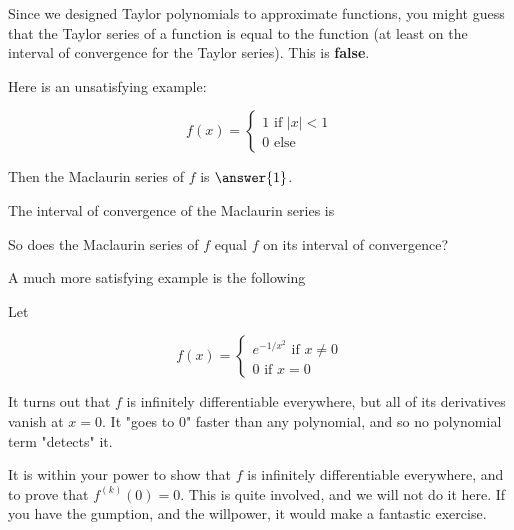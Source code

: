 \documentclass{ximera}
\begin{document}
\begin{warning}
	Since we designed Taylor polynomials to approximate functions, you might guess that the Taylor series of a function is equal to the function (at least on the interval of convergence for the Taylor series).  This is \textbf{false}.
\end{warning}

Here is an unsatisfying example:

\begin{example}
	\[
	f(x) = \begin{cases}
		1 \textrm{ if $|x|<1$}\\
		0 \textrm{ else}
		\end{cases}
	\]
	
	Then the Maclaurin series of $f$ is $\answer{1}$.
	
	The interval of convergence of the Maclaurin series is
	
	\begin{multipleChoice}
		\choice[correct]{$\infty$}
	\end{multipleChoice}
	
	So does the Maclaurin series of $f$ equal $f$ on its interval of convergence?
	
	\begin{multipleChoice}
		\choice{Yes}
		\choice[correct]{No}
	\end{multipleChoice}
\end{example}

A much more satisfying example is the following

\begin{example}
	Let 
	
	\[
	f(x) = \begin{cases}
		e^{-1/x^2} \textrm{ if $x \neq 0$}\\
		0 \textrm{ if $x = 0$}
	\end{cases}
	\]
	
	It turns out that $f$ is infinitely differentiable everywhere, but all of its derivatives vanish at $x=0$.  It "goes to $0$" faster than any polynomial, and so no polynomial term "detects" it.
	
	It is within your power to show that $f$ is infinitely differentiable everywhere, and to prove that $f^{(k)}(0) = 0$.  This is quite involved, and we will not do it here.  If you have the gumption, and the willpower, it would make a fantastic exercise.
\end{example}
\end{document}

